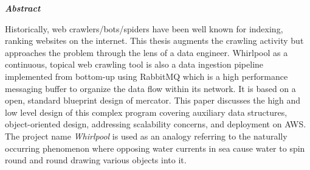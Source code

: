 \begin{center}




\textit{\bf Abstract}

\hfill\break

\end{center}

\vspace{1mm}

\normalsize
\noindent Historically, web crawlers/bots/spiders have been well known for indexing, ranking
websites on the internet. This thesis augments the crawling activity but approaches
the problem through the lens of a data engineer. Whirlpool as a continuous, topical
web crawling tool is also a data ingestion pipeline implemented from bottom-up using
RabbitMQ which is a high performance messaging buffer to organize the data flow
within its network. It is based on a open, standard blueprint design of mercator.
This paper discusses the high and low level design of this complex program covering
auxiliary data structures, object-oriented design, addressing scalability concerns, and
deployment on AWS. The project name \textit{Whirlpool} is used as an analogy referring to the naturally occurring phenomenon where opposing water currents in sea cause water to spin round and round drawing various objects into it.




